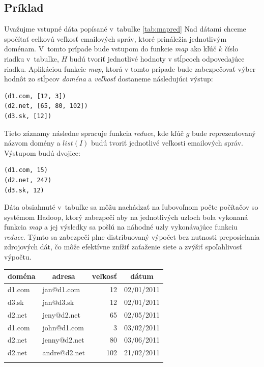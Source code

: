\documentclass[11pt,twoside,a4paper]{book}
\begin{document}
\subsection*{Príklad}

Uvažujme vstupné dáta popísané v~tabuľke \ref{tab:mapred} Nad dátami chceme spočítať celkovú veľkosť emailových správ, ktoré prináležia jednotlivým doménam. V~tomto prípade bude vstupom do funkcie \emph{map} ako kľúč $k$ číslo riadku v~tabuľke, $H$ budú tvoriť jednotlivé hodnoty v stĺpcoch odpovedajúce riadku. Aplikáciou funkcie \emph{map}, ktorá v tomto prípade bude zabezpečovať výber hodnôt zo stĺpcov \emph{doména} a \emph{veľkosť} dostaneme následujúci výstup:

\begin{verbatim}
(d1.com, [12, 3])
(d2.net, [65, 80, 102])
(d3.sk, [12])
\end{verbatim}

Tieto záznamy následne spracuje funkcia \emph{reduce}, kde kľúč $g$ bude reprezentovaný názvom domény a $list(I)$ budú tvoriť jednotlivé veľkosti emailových správ. Výstupom budú dvojice:

\begin{verbatim}
(d1.com, 15)
(d2.net, 247)
(d3.sk, 12)
\end{verbatim}

Dáta obsiahnuté v~tabuľke sa môžu nachádzať na ľubovoľnom počte počítačov so systémom Hadoop, ktorý zabezpečí aby na jednotlivých uzloch bola vykonaná funkcia \emph{map} a jej výsledky sa pošlú na náhodné uzly vykonávajúce funkciu \emph{reduce}. Týmto sa zabezpečí plne distribuovaný výpočet bez nutnosti preposielania zdrojových dát, čo môže efektívne znížiť zaťaženie siete a zvýšiť spoľahlivosť výpočtu.


{\centering%
\label{tab:001}\par\bigskip
\begin{tabular}{llrl}\toprule
  \multicolumn{1}{c}{doména} & \multicolumn{1}{c}{adresa} & \multicolumn{1}{c}{veľkosť} &\multicolumn{1}{c}{dátum}\\\midrule\addlinespace
    d1.com & jan@d1.com & 12 & 02/01/2011\\\addlinespace    
    d3.sk  & jan@d3.sk & 12 & 02/01/2011\\\addlinespace
    d2.net & jeny@d2.net & 65 & 02/05/2011\\\addlinespace
    d1.com & john@d1.com & 3 & 03/02/2011\\\addlinespace
    d2.net & jenny@d2.net & 80 & 03/06/2011\\\addlinespace
    d2.net & andre@d2.net & 102 & 21/02/2011\\\addlinespace
 \hline
\end{tabular}\\}
\label{tab:mapred}
\par\bigskip
\end{document}
